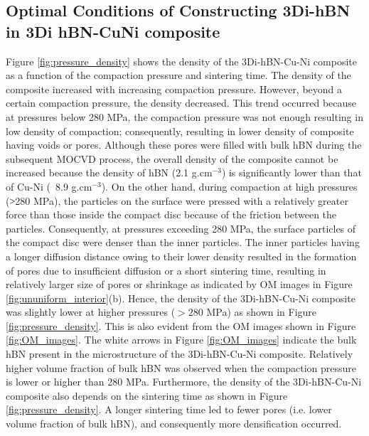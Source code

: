 \subsection{Optimal Conditions of Constructing 3Di-hBN in 3Di hBN-CuNi composite}
Figure \ref{fig:pressure_density} shows the density of the 3Di-hBN-Cu-Ni composite as a function of the compaction pressure and sintering time. The density of the composite increased with increasing compaction pressure. However, beyond a certain compaction pressure, the density decreased. This trend occurred because at pressures below 280 MPa, the compaction pressure was not enough resulting in low density of compaction; consequently, resulting in lower density of composite having voids or pores. Although these pores were filled with bulk hBN during the subsequent MOCVD process, the overall density of the composite cannot be increased because the density of hBN (2.1 g.c$\text{m}^{-3}$) is significantly lower than that of Cu-Ni (~8.9 g.c$\text{m}^{-3}$). On the other hand, during compaction at high pressures ($˃$280 MPa), the particles on the surface were pressed with a relatively greater force than those inside the compact disc because of the friction between the particles. Consequently, at pressures exceeding 280 MPa, the surface particles of the compact disc were denser than the inner particles. The inner particles having a longer diffusion distance owing to their lower density resulted in the formation of pores due to insufficient diffusion or a short sintering time, resulting in relatively larger size of pores or shrinkage as indicated by OM images in Figure \ref {fig:ununiform_interior}(b). Hence, the density of the 3Di-hBN-Cu-Ni composite was slightly lower at higher pressures ($>28$0 MPa) as shown in Figure \ref{fig:pressure_density}. This is also evident from the OM images shown in Figure \ref{fig:OM_images}. The white arrows in Figure \ref{fig:OM_images} indicate the bulk hBN present in the microstructure of the 3Di-hBN-Cu-Ni composite. Relatively higher volume fraction of bulk hBN was observed when the compaction pressure is lower or higher than 280 MPa. Furthermore, the density of the 3Di-hBN-Cu-Ni composite also depends on the sintering time as shown in Figure \ref{fig:pressure_density}. A longer sintering time led to fewer pores (i.e. lower volume fraction of bulk hBN), and consequently more densification occurred.

